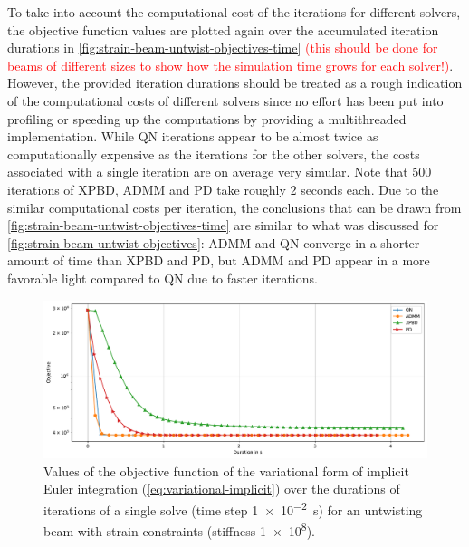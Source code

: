 To take into account the computational cost of the iterations for different solvers, the objective function values are plotted again over the accumulated
iteration durations in \autoref{fig:strain-beam-untwist-objectives-time} \textcolor{red}{(this should be done for beams of different sizes to show how the simulation
time grows for each solver!)}. However, the provided iteration durations should be treated as a rough indication of the 
computational costs of different solvers since no effort has been put into profiling or speeding up the computations by providing a multithreaded 
implementation. While QN iterations appear to be almost twice as computationally expensive as the iterations 
for the other solvers, the costs associated with a single iteration are on average very simular. Note that 500 iterations of XPBD, ADMM and PD 
take roughly 2 seconds each. Due to the similar computational costs per iteration, the conclusions that can be drawn from \autoref{fig:strain-beam-untwist-objectives-time}
are similar to what was discussed for \autoref{fig:strain-beam-untwist-objectives}: ADMM and QN converge in a shorter amount of time than XPBD and PD, but ADMM and PD
appear in a more favorable light compared to QN due to faster iterations.

\begin{figure}[h]
    \includegraphics[width=\textwidth]{figures/strain_beam_untwist_objectives_time.pdf}
    \caption{Values of the objective function of the variational form of implicit Euler integration (\cref{eq:variational-implicit}) over the durations of iterations 
        of a single solve (time step \SI{1e-2}{\second}) for an untwisting beam with strain constraints (stiffness \num{1e8}).}
    \label{fig:strain-beam-untwist-objectives-time}
\end{figure}

